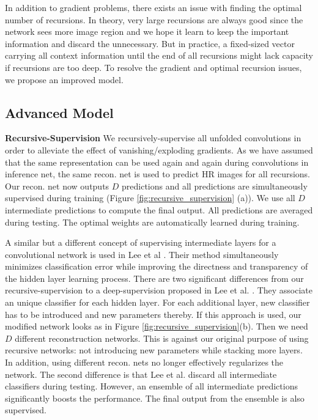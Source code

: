 \documentclass[10pt,twocolumn,letterpaper]{article}
\begin{document}
In addition to gradient problems, there exists an issue with finding the optimal number of recursions. In theory, very large recursions are always good since the network sees more image region and we hope it learn to keep the important information and discard the unnecessary.  But in practice, a fixed-sized vector carrying all context information until the end of all recursions might lack capacity if recursions are too deep. To resolve the gradient and optimal recursion issues, we propose an improved model.

\subsection{Advanced Model} 
\textbf{Recursive-Supervision} We recursively-supervise all unfolded convolutions in order to alleviate the effect of vanishing/exploding gradients. As we have assumed that the same representation can be used again and again during convolutions in inference net, the same recon. net is used to predict HR images for all recursions. Our recon. net now outputs $D$ predictions and all predictions are simultaneously supervised during training (Figure \ref{fig:recursive_supervision} (a)). We use all $D$ intermediate predictions to compute the final output. All predictions are averaged during testing. The optimal weights are automatically learned during training. 

A similar but a different concept of supervising intermediate layers for a convolutional network is used in Lee et al  \cite{lee2014deeply}. Their method simultaneously minimizes classification error while improving the directness and transparency of the hidden layer learning process. There are two significant differences from our recursive-supervision to a deep-supervision proposed in Lee et al. \cite{lee2014deeply}. They associate an unique classifier for each hidden layer. For each additional layer, new classifier has to be introduced and new parameters thereby. If this approach is used, our modified network looks as in Figure \ref{fig:recursive_supervision}(b). Then we need $D$ different reconstruction networks. This is against our original purpose of using recursive networks: not introducing new parameters while stacking more layers. In addition, using different recon. nets no longer effectively regularizes the network. The second difference is that Lee et al. \cite{lee2014deeply} discard all intermediate classifiers during testing. However, an ensemble of all intermediate predictions significantly boosts the performance. The final output from the ensemble is also supervised.
\end{document}
